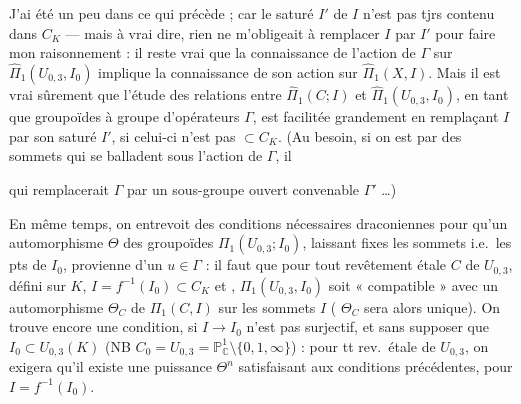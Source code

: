 \documentclass[11pt,a4paper]{article}
\begin{document}
J'ai été un peu  dans ce qui précède ; car le saturé $I'$  de $I$ n'est pas tjrs  contenu dans $C_K$ --- mais à vrai dire, rien ne m'obligeait à remplacer $I$ par $I'$ \struck{\ill{}} pour faire mon raisonnement : il reste vrai que la connaissance de l'action de $\Gamma$ sur $\hat{\Pi}_1(U_{0,3}, I_0)$ implique la connaissance de son action sur $\hat{\Pi}_1(X, I)$. Mais il est vrai sûrement que l'étude des relations entre $\hat{\Pi}_1(C; I)$ et $\hat{\Pi}_1(U_{0,3}, I_0)$, en tant que groupoïdes à groupe d'opérateurs $\Gamma$, est facilitée grandement en remplaçant $I$ par son saturé $I'$,  si celui-ci n'est pas $\subset C_K$. (Au besoin, si on est \struck{\ill{}} \ill{} par des sommets qui se balladent sous l'action de $\Gamma$, il 

qui remplacerait $\Gamma$ par un sous-groupe ouvert convenable $\Gamma'$ \ldots)

En même temps, on entrevoit des conditions nécessaires draconiennes pour qu'un automorphisme $\Theta$ des groupoïdes $\Pi_1(U_{0,3}; I_0)$, laissant fixes les sommets i.e.\ les pts de $I_0$, provienne d'un $u \in \Gamma$ : il faut que pour tout revêtement étale $C$ de $U_{0,3}$, défini sur $K$, \struck{\ill{}}  $I = f^{-1}(I_0) \subset C_K$ et  ,  \add{$\Theta$}   $\Pi_1(U_{0,3}, I_0)$ soit « compatible » avec un automorphisme  $\Theta_C$ de $\Pi_1(C, I)$   sur les sommets $I$ ( $\Theta_C$ sera  alors unique). On trouve encore une condition,  si $I \to I_0$ n'est pas surjectif, et sans supposer  que $I_0 \subset U_{0,3}(K)$ (NB $C_0 = U_{0,3} = \mathbb{P}^1_{\mathbb{C}} \setminus \{0, 1, \infty\}$) : pour tt rev.\ étale de $U_{0,3}$, on exigera   qu'il existe une puissance $\Theta^{n}$  satisfaisant aux conditions précédentes, pour $I = f^{-1}(I_0)$.

\end{document}
